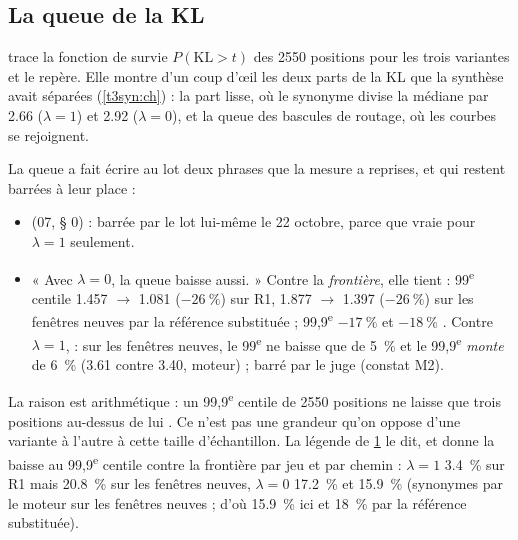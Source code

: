 \subsection{La queue de la KL}\label{t3sno:sec:queue}

 trace la fonction de survie $P(\mathrm{KL} > t)$ des \num{2550} positions pour les trois variantes et le repère. Elle montre d'un coup d'œil les deux parts de la KL que la synthèse avait séparées (\cref{t3syn:ch}) : la part lisse, où le synonyme divise la médiane par \num{2.66} ($\lambda = 1$) et \num{2.92} ($\lambda = 0$), et la queue des bascules de routage, où les courbes se rejoignent.

\begin{figure}[tbp]
\centering
\GrapheSynoQueue
{}
\label{fig:t3-syno-queue}
\end{figure}

La queue a fait écrire au lot deux phrases que la mesure a reprises, et qui restent barrées à leur place :
\begin{itemize}
\item {} (07, § 0) : barrée par le lot lui-même le 22 octobre, parce que vraie pour $\lambda = 1$ seulement.
\item « Avec $\lambda = 0$, la queue baisse aussi. » Contre la \emph{frontière}, elle tient : 99\textsuperscript{e} centile \num{1.457} $\to$ \num{1.081} ($-\SI{26}{\percent}$) sur R1, \num{1.877} $\to$ \num{1.397} ($-\SI{26}{\percent}$) sur les fenêtres neuves par la référence substituée ; 99,9\textsuperscript{e} $-\SI{17}{\percent}$ et $-\SI{18}{\percent}$ \mes. Contre $\lambda = 1$,  : sur les fenêtres neuves, le 99\textsuperscript{e} ne baisse que de \SI{5}{\percent} et le 99,9\textsuperscript{e} \emph{monte} de \SI{6}{\percent} (\num{3.61} contre \num{3.40}, moteur) ; barré par le juge (constat M2).
\end{itemize}
La raison est arithmétique : un 99,9\textsuperscript{e} centile de \num{2550} positions ne laisse que trois positions au-dessus de lui \calc. Ce n'est pas une grandeur qu'on oppose d'une variante à l'autre à cette taille d'échantillon. La légende de \cref{fig:t3-syno-queue} le dit, et donne la baisse au 99,9\textsuperscript{e} centile contre la frontière par jeu et par chemin : $\lambda = 1$ \SI{3.4}{\percent} sur R1 mais \SI{20.8}{\percent} sur les fenêtres neuves, $\lambda = 0$ \SI{17.2}{\percent} et \SI{15.9}{\percent} (synonymes par le moteur sur les fenêtres neuves ; d'où \SI{15.9}{\percent} ici et \SI{18}{\percent} par la référence substituée).

